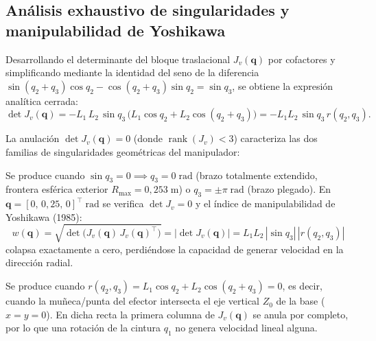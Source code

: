 \documentclass[11pt,a4paper]{article}
\newcommand{\T}{^{\!\top}}
\newcommand{\abs}[1]{\left\lvert#1\right\rvert}
\begin{document}
\subsection{Análisis exhaustivo de singularidades y manipulabilidad de Yoshikawa}
\label{sec:sing}

Desarrollando el determinante del bloque traslacional $J_{v}(\bm{q})$ por cofactores y simplificando mediante la identidad del seno de la diferencia $\sin(q_{2}+q_{3})\cos q_{2}-\cos(q_{2}+q_{3})\sin q_{2}=\sin q_{3}$, se obtiene la expresión analítica cerrada:
\begin{equation}\label{eq:detJ}
\boxed{\det J_{v}(\bm{q})=-L_{1}\,L_{2}\,\sin q_{3}\,\bigl(L_{1}\cos q_{2}+L_{2}\cos(q_{2}+q_{3})\bigr)=-L_{1}L_{2}\,\sin q_{3}\,r(q_{2},q_{3}).}
\end{equation}

La anulación $\det J_{v}(\bm{q})=0$ (donde $\operatorname{rank}(J_{v})<3$) caracteriza las dos familias de singularidades geométricas del manipulador:

\begin{cajaadv}
Se produce cuando $\sin q_{3}=0\implies q_{3}=0\;\text{rad}$ (brazo totalmente extendido, frontera esférica exterior $R_{\max}=0{,}253\;\text{m}$) o $q_{3}=\pm\pi\;\text{rad}$ (brazo plegado). En $\bm{q}=[0,\,0{,}25,\,0]\T\;\text{rad}$ se verifica $\det J_{v}=0$ y el índice de manipulabilidad de Yoshikawa (1985):
\begin{equation}\label{eq:yoshikawa}
w(\bm{q})=\sqrt{\det\bigl(J_{v}(\bm{q})\,J_{v}(\bm{q})\T\bigr)}=\abs{\det J_{v}(\bm{q})}=L_{1}L_{2}\,\abs{\sin q_{3}}\,\abs{r(q_{2},q_{3})}
\end{equation}
colapsa exactamente a cero, perdiéndose la capacidad de generar velocidad en la dirección radial.
\end{cajaadv}

\begin{cajaadv}
Se produce cuando $r(q_{2},q_{3})=L_{1}\cos q_{2}+L_{2}\cos(q_{2}+q_{3})=0$, es decir, cuando la muñeca/punta del efector intersecta el eje vertical $Z_{0}$ de la base ($x=y=0$). En dicha recta la primera columna de $J_{v}(\bm{q})$ se anula por completo, por lo que una rotación de la cintura $q_{1}$ no genera velocidad lineal alguna.
\end{cajaadv}
\end{document}
